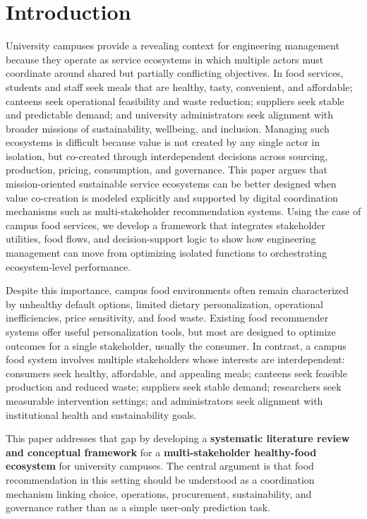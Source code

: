 \section{Introduction}\label{introduction}

University campuses provide a revealing context for engineering
management because they operate as service ecosystems in which multiple
actors must coordinate around shared but partially conflicting
objectives. In food services, students and staff seek meals that are
healthy, tasty, convenient, and affordable; canteens seek operational
feasibility and waste reduction; suppliers seek stable and predictable
demand; and university administrators seek alignment with broader
missions of sustainability, wellbeing, and inclusion. Managing such
ecosystems is difficult because value is not created by any single actor
in isolation, but co-created through interdependent decisions across
sourcing, production, pricing, consumption, and governance. This paper
argues that mission-oriented sustainable service ecosystems can be
better designed when value co-creation is modeled explicitly and
supported by digital coordination mechanisms such as multi-stakeholder
recommendation systems. Using the case of campus food services, we
develop a framework that integrates stakeholder utilities, food flows,
and decision-support logic to show how engineering management can move
from optimizing isolated functions to orchestrating ecosystem-level
performance.

Despite this importance, campus food environments often remain
characterized by unhealthy default options, limited dietary
personalization, operational inefficiencies, price sensitivity, and food
waste. Existing food recommender systems offer useful personalization
tools, but most are designed to optimize outcomes for a single
stakeholder, usually the consumer. In contrast, a campus food system
involves multiple stakeholders whose interests are interdependent:
consumers seek healthy, affordable, and appealing meals; canteens seek
feasible production and reduced waste; suppliers seek stable demand;
researchers seek measurable intervention settings; and administrators
seek alignment with institutional health and sustainability goals.

This paper addresses that gap by developing a \textbf{systematic
literature review and conceptual framework} for a
\textbf{multi-stakeholder healthy-food ecosystem} for university
campuses. The central argument is that food recommendation in this
setting should be understood as a coordination mechanism linking choice,
operations, procurement, sustainability, and governance rather than as a
simple user-only prediction task.

